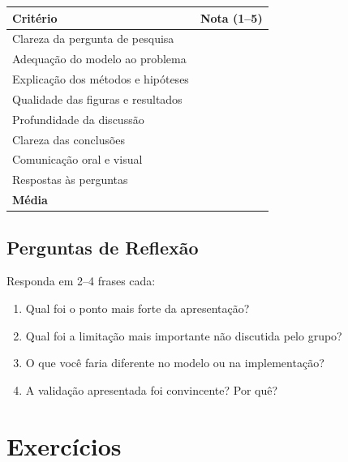 \documentclass[12pt,a4paper]{article}
\begin{document}
\begin{tabular}{|l|c|}
\hline
\textbf{Crit\'erio} & \textbf{Nota (1--5)} \\
\hline
Clareza da pergunta de pesquisa & \\
Adequa\c{c}\~ao do modelo ao problema & \\
Explica\c{c}\~ao dos m\'etodos e hip\'oteses & \\
Qualidade das figuras e resultados & \\
Profundidade da discuss\~ao & \\
Clareza das conclus\~oes & \\
Comunica\c{c}\~ao oral e visual & \\
Respostas \`as perguntas & \\
\hline
\textbf{M\'edia} & \\
\hline
\end{tabular}

\subsection*{Perguntas de Reflex\~ao}
Responda em 2--4 frases cada:
\begin{enumerate}
  \item Qual foi o ponto mais forte da apresenta\c{c}\~ao?
  \item Qual foi a limita\c{c}\~ao mais importante n\~ao discutida pelo grupo?
  \item O que voc\^e faria diferente no modelo ou na implementa\c{c}\~ao?
  \item A valida\c{c}\~ao apresentada foi convincente? Por qu\^e?
\end{enumerate}

\section*{Exerc\'icios}
\end{document}
